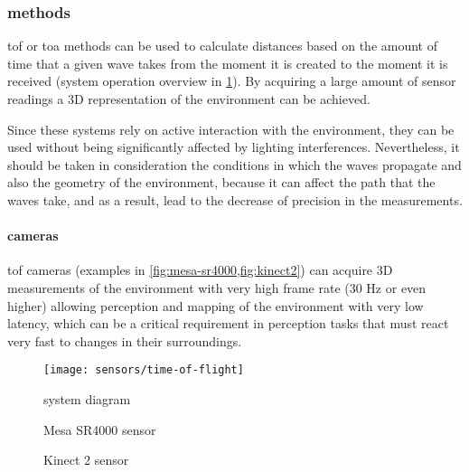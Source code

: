 \subsubsection{ methods}\label{sec:tof-methods}

\gls{tof} or \gls{toa} methods can be used to calculate distances based on the amount of time that a given wave takes from the moment it is created to the moment it is received (system operation overview in \cref{fig:time-of-flight}). By acquiring a large amount of sensor readings a 3D representation of the environment can be achieved.

Since these systems rely on active interaction with the environment, they can be used without being significantly affected by lighting interferences. Nevertheless, it should be taken in consideration the conditions in which the waves propagate and also the geometry of the environment, because it can affect the path that the waves take, and as a result, lead to the decrease of precision in the measurements.


\paragraph{ cameras}

\gls{tof} cameras (examples in \cref{fig:mesa-sr4000,fig:kinect2}) can acquire 3D measurements of the environment with very high frame rate (30 Hz or even higher) allowing perception and mapping of the environment with very low latency, which can be a critical requirement in perception tasks that must react very fast to changes in their surroundings.

\begin{figure}[H]
	\centering
	\texttt{[image: sensors/time-of-flight]}
	\caption[ system diagram]{ system diagram\protect\footnotemark}
	\label{fig:time-of-flight}
\end{figure}

\begin{figure}[H]
	\begin{floatrow}[2]
		{\caption[Mesa SR4000 sensor]{Mesa SR4000 sensor\protect\footnotemark}\label{fig:mesa-sr4000}}
		{\caption[Kinect 2 sensor]{Kinect 2 sensor\protect\footnotemark}\label{fig:kinect2}}
	\end{floatrow}
\end{figure}


